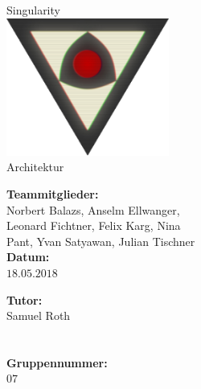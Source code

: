 \documentclass[12pt]{article}
\newcommand{\changefont}[4]{{\fontfamily{#1}\fontsize{#2}{#3}\selectfont #4}} %
\begin{document}
\renewcommand{\figurename}{Fig.}%
\renewcommand{\arraystretch}{1.4}%

\begin{titlepage}
	\begin{center}
		\changefont{pbk}{32}{35}{Singularity}\\\vspace{3em}
		\includegraphics[width=0.4\textwidth]{res/SingularityLogo2.png}\\\vspace{5em}
		\changefont{cmr}{32}{35}{Architektur}
	\end{center}
	\vspace{7em}

	\begin{minipage}[t]{.5\textwidth}
		\begin{center}
			\textbf{Teammitglieder:}\\
			\vspace{.5em}
			Norbert Balazs, Anselm Ellwanger,\\
			Leonard Fichtner, Felix Karg, Nina\\
			Pant, Yvan Satyawan, Julian Tischner\\
			\vspace{2em}
			\textbf{Datum:}\\
			\vspace{.5em}
			$18.05.2018$
		\end{center}
	\end{minipage}
	\begin{minipage}[t]{.5\textwidth}
		\begin{center}
			\textbf{Tutor:}\\
			\vspace{.5em}
			Samuel Roth\\
			\quad\\
			\quad\\
			\vspace{2em}
			\textbf{Gruppennummer:}\\
			\vspace{.5em}
			$07$
		\end{center}
	\end{minipage}
\end{titlepage}
\end{document}
